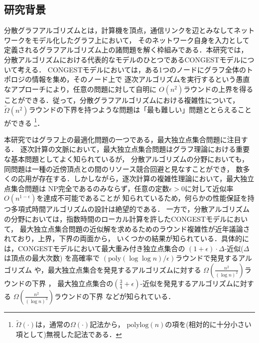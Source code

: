\documentclass[a4j,twoside]{jarticle}
\newcommand{\CONGEST}{\textsf{CONGEST}}
\theoremstyle{definition}
\begin{document}
\twocolumn[\vspace*{9mm}]
\begin{論文概要}
\setcounter{page}{1}


\section{研究背景}
分散グラフアルゴリズムとは，計算機を頂点，通信リンクを辺とみなしてネットワークをモデル化したグラフ上において，
そのネットワーク自身を入力として定義されるグラフアルゴリズム上の諸問題を解く枠組みである．本研究では，
分散アルゴリズムにおける代表的なモデルのひとつである{{\CONGEST}}モデルについて考える．
{\CONGEST}モデルにおいては，ある1つのノードにグラフ全体のトポロジの情報を集め，そのノード上で
逐次アルゴリズムを実行するという愚直なアプローチにより，任意の問題に対して自明に
$O (n^{2})$ラウンドの上界を得ることができる．従って，分散グラフアルゴリズムにおける複雑性について，
$\tilde{\Omega}(n^2)$ラウンドの下界を持つような問題は「最も難しい」問題ととらえることができる
\footnote{$\tilde{\Omega}(\cdot)$は，通常の$\Omega(\cdot)$記法から，
$\mathrm{polylog}(n)$の項を(相対的に十分小さい項として)無視した記法である．}．

本研究ではグラフ上の最適化問題の一つである，最大独立点集合問題に注目する．
逐次計算の文脈において，最大独立点集合問題はグラフ理論における重要な基本問題としてよく知られているが，
分散アルゴリズムの分野においても，同問題は一種の近傍頂点との間のリソース競合回避と見なすことができ，
数多くの応用が存在する．しかしながら，逐次計算の複雑性理論において，最大独立点集合問題は
NP完全であるのみならず，任意の定数$\epsilon > 0$に対して近似率$O(n^{1-\epsilon})$を達成不可能であることが
知られている\cite{haastad1999clique}ため，何らかの性能保証を持つ多項式時間アルゴリズムの設計は絶望的である．
一方で，分散アルゴリズムの分野においては，指数時間のローカル計算を許した{\CONGEST}モデルにおいて，
最大独立点集合問題の近似解を求めるためのラウンド複雑性が近年議論されており，上界，下界の両面から，
いくつかの結果が知られている．具体的には，{\CONGEST}モデルにおいて最大重み付き独立点集合の
$(1 + \epsilon) \cdot \Delta$-近似($\Delta$は頂点の最大次数) を高確率で
$\left(\mathrm{poly}(\log \log n)/\epsilon \right)$ラウンドで発見するアルゴリズム
\cite{kawarabayashi2019improved} や，最大独立点集合を発見するアルゴリズムに対する
$\Omega \left(\frac{n^{2}}{(\log n)^{2}}\right)$ラウンドの下界 \cite{censor2017quadratic}，
最大独立点集合の$(\frac{3}{4} + \epsilon)$-近似を発見するアルゴリズムに対する
$\Omega \left(\frac{n^{2}}{(\log n)^{3}}\right)$ラウンドの下界 \cite{efron2020beyond} などが知られている．


\end{論文概要}
\end{document}
